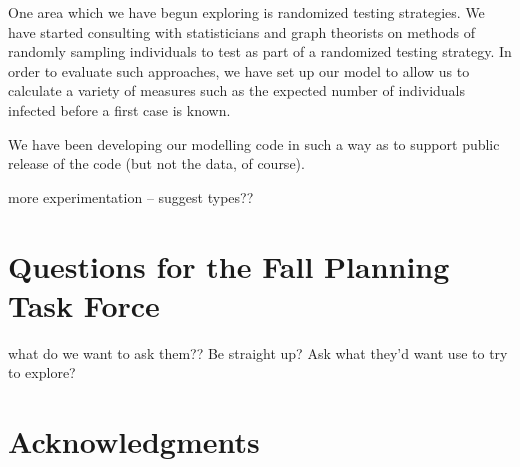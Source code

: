 \documentclass[fleqn,10pt]{SelfArx} %
\newcommand{\ed}[1]{{\color{blue} #1}}
\begin{document}
One area which we have begun exploring is randomized testing strategies.  We have started consulting with statisticians and graph theorists on methods of randomly sampling individuals to test as part of a randomized testing strategy.  In order to evaluate such approaches, we have set up our model to allow us to calculate a variety of measures such as the expected number of individuals infected before a first case is known.

We have been developing our modelling code in such a way as to support public release of the code (but not the data, of course).

\ed{more experimentation -- suggest types??}

\section{Questions for the Fall Planning Task Force}

\ed{what do we want to ask them??  Be straight up?  Ask what they'd want use to try to explore?}

\section*{Acknowledgments} %






\end{document}
